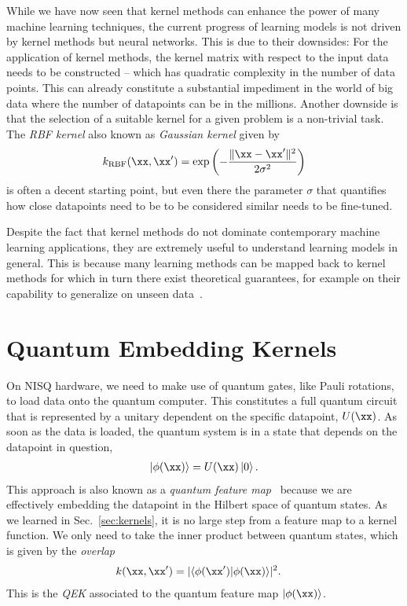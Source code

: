\documentclass[twocolumn,superscriptaddress,nofootinbib]{revtex4-2}
\providecommand{\abs}[1]{\lvert #1 \rvert}
\begin{document}
While we have now seen that kernel methods can enhance the power of many machine learning techniques, the current progress of learning models is not driven by kernel methods but neural networks. This is due to their downsides: For the application of kernel methods, the kernel matrix with respect to the input data needs to be constructed -- which has quadratic complexity in the number of data points. This can already constitute a substantial impediment in the world of big data where the number of datapoints can be in the millions.
Another downside is that the selection of a suitable kernel for a given problem is a non-trivial task. The \emph{\ac{RBF} kernel} also known as \emph{Gaussian kernel} given by
\begin{align}\label{eqn:def_rbf_kernel}
    k_{\text{RBF}}(\xx, \xx') = \exp\left(-\frac{\lVert \xx - \xx' \rVert^2}{2 \sigma^2} \right)
\end{align}
is often a decent starting point, but even there the parameter $\sigma$ that quantifies how close datapoints need to be to be considered similar needs to be fine-tuned. 

Despite the fact that kernel methods do not dominate contemporary machine learning applications, they are extremely useful to understand learning models in general. This is because many learning methods can be mapped back to kernel methods for which in turn there exist theoretical guarantees, for example on their capability to generalize on unseen data~\cite{scholkopf2002learning}.
    
\section{Quantum Embedding Kernels}\label{sec:quantum_embedding_kernels}

On \ac{NISQ} hardware, we need to make use of quantum gates, like Pauli rotations, to load data onto the quantum computer. This constitutes a full quantum circuit that is represented by a unitary dependent on the specific datapoint, $U(\xx)$. As soon as the data is loaded, the quantum system is in a state that depends on the datapoint in question, 
\begin{align}
    \ket{\phi(\xx)} = U(\xx) \ket{0}.
\end{align}
This approach is also known as a \emph{quantum feature map}~\cite{schuld2019quantum_feature_hilbert_space} because we are effectively embedding the datapoint in the Hilbert space of quantum states.
As we learned in Sec.~\ref{sec:kernels}, it is no large step from a feature map to a kernel function. We only need to take the inner product between quantum states, which is given by the \emph{overlap}
\begin{align}\label{eqn:qek_pure_state}
    k(\xx,\xx') &= \abs{\braket{\phi(\xx')|\phi(\xx)}}^2.
\end{align}
This is the \emph{\acf{QEK}} associated to the quantum feature map $\ket{\phi(\xx)}$. 
\end{document}

